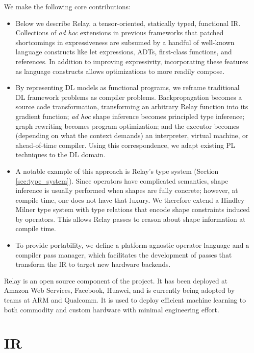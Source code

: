 We make the following core contributions:
\begin{itemize}
  \item
  Below we describe Relay, a tensor-oriented, statically typed,
    functional IR.
  Collections of \textit{ad hoc} extensions in previous frameworks
    that patched shortcomings in expressiveness are subsumed by a handful of well-known language
    constructs like let expressions, ADTs, first-class functions, and references.
  In addition to improving expressivity,
    incorporating these features as language constructs
    allows optimizations to more readily compose.
  \item
  By representing DL models as functional programs, we reframe traditional
    DL framework problems as compiler problems.
  Backpropagation becomes a source code transformation,
    transforming an arbitrary Relay function into its gradient function;
    \textit{ad hoc} shape inference becomes principled type inference;
    graph rewriting becomes program optimization;
    and the executor becomes (depending on what the context demands) an
    interpreter, virtual machine, or ahead-of-time compiler.
  Using this correspondence, we adapt existing
    PL techniques to the DL domain.
  \item
    A notable example of this approach is Relay's type system (Section \ref{sec:type_system}).
    Since operators have complicated semantics, shape inference is usually
      performed when shapes are fully concrete;
      however, at compile time, one does not have that luxury.
    We therefore extend a Hindley-Milner type system with type relations that encode shape
      constraints induced by operators.
    This allows Relay passes to reason about shape information at compile time.
  \item To provide portability,
    we define a platform-agnostic operator language
    and a compiler pass manager, which facilitates the development of
    passes that transform the IR to target new hardware backends.
\end{itemize}

Relay is an open source component of the \tvm project.
It has been deployed at Amazon Web Services, Facebook, Huawei,
  and is currently being adopted by teams at ARM and Qualcomm.
It is used to deploy efficient machine learning to
  both commodity and custom hardware with minimal
  engineering effort.

\section{IR}

